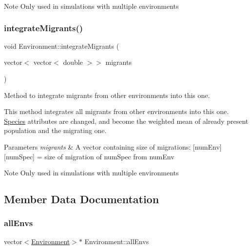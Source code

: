 \begin{DoxyNote}{Note}
Only used in simulations with multiple environments 
\end{DoxyNote}
\hypertarget{classEnvironment_ae2fd5fc149c2eaf2a2e41af008fc5515}{}\label{classEnvironment_ae2fd5fc149c2eaf2a2e41af008fc5515} 
\subsubsection{\texorpdfstring{integrate\+Migrants()}{integrateMigrants()}}
{\footnotesize\ttfamily void Environment\+::integrate\+Migrants (\begin{DoxyParamCaption}\item[{vector$<$ vector$<$ double $>$$>$}]{migrants }\end{DoxyParamCaption})}



Method to integrate migrants from other environments into this one. 

This method integrates all migrants from other environments into this one. \hyperlink{classSpecies}{Species} attributes are changed, and become the weighted mean of already present population and the migrating one.


\begin{DoxyParams}{Parameters}
{\em migrants} & A vector containing size of migrations\+: \mbox{[}num\+Env\mbox{]}\mbox{[}num\+Spec\mbox{]} = size of migration of num\+Spec from num\+Env \\
\hline
\end{DoxyParams}
\begin{DoxyNote}{Note}
Only used in simulations with multiple environments 
\end{DoxyNote}


\subsection{Member Data Documentation}
\hypertarget{classEnvironment_a429ca4342b5a89b28be803c166a48c71}{}\label{classEnvironment_a429ca4342b5a89b28be803c166a48c71} 
\subsubsection{\texorpdfstring{all\+Envs}{allEnvs}}
{\footnotesize\ttfamily vector$<$\hyperlink{classEnvironment}{Environment}$>$$\ast$ Environment\+::all\+Envs\hspace{0.3cm}{\ttfamily [protected]}}

